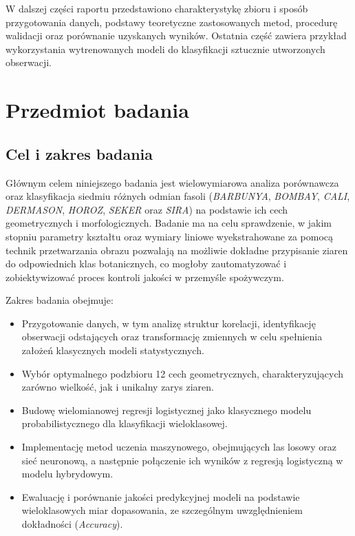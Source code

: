 \documentclass{report}
\begin{document}
W dalszej części raportu przedstawiono charakterystykę zbioru i sposób przygotowania danych, podstawy teoretyczne zastosowanych metod, procedurę walidacji oraz porównanie uzyskanych wyników. Ostatnia część zawiera przykład wykorzystania wytrenowanych modeli do klasyfikacji sztucznie utworzonych obserwacji.



\chapter{Przedmiot badania}

\section{Cel i zakres badania}

Głównym celem niniejszego badania jest wielowymiarowa analiza porównawcza oraz klasyfikacja siedmiu różnych odmian fasoli (\textit{BARBUNYA}, \textit{BOMBAY}, \textit{CALI}, \textit{DERMASON}, \textit{HOROZ}, \textit{SEKER} oraz \textit{SIRA}) na podstawie ich cech geometrycznych i morfologicznych. Badanie ma na celu sprawdzenie, w jakim stopniu parametry kształtu oraz wymiary liniowe wyekstrahowane za pomocą technik przetwarzania obrazu pozwalają na możliwie dokładne przypisanie ziaren do odpowiednich klas botanicznych, co mogłoby zautomatyzować i zobiektywizować proces kontroli jakości w przemyśle spożywczym.

Zakres badania obejmuje:
\begin{itemize}
    \item Przygotowanie danych, w tym analizę struktur korelacji, identyfikację obserwacji odstających oraz transformację zmiennych w celu spełnienia założeń klasycznych modeli statystycznych.
    \item Wybór optymalnego podzbioru 12 cech geometrycznych, charakteryzujących zarówno wielkość, jak i unikalny zarys ziaren.
    \item Budowę wielomianowej regresji logistycznej jako klasycznego modelu probabilistycznego dla klasyfikacji wieloklasowej.
    \item Implementację metod uczenia maszynowego, obejmujących las losowy oraz sieć neuronową, a następnie połączenie ich wyników z regresją logistyczną w modelu hybrydowym.
    \item Ewaluację i porównanie jakości predykcyjnej modeli na podstawie wieloklasowych miar dopasowania, ze szczególnym uwzględnieniem dokładności (\textit{Accuracy}).
\end{itemize}
\end{document}
